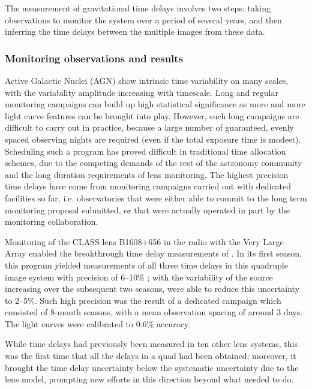 The measurement of gravitational time delays involves two steps:  taking
observations to monitor the system over a period of several years,
and then inferring the time delays between the multiple images from
these data.


\subsubsection{Monitoring observations and results}

Active Galactic Nuclei (AGN) show intrinsic time variability on many
scales, with the variability amplitude increasing with timescale. Long
and regular
monitoring campaigns can build up high statistical significance as
more and more light curve features can be brought into play.  However,
such long campaigns are difficult to carry out in practice, because a
large number of
guaranteed, evenly spaced
observing nights are required (even if the
total exposure time is modest). Scheduling such a program has proved
difficult in traditional time allocation schemes, due to the competing
demands of the rest of the astronomy community and the long duration
requirements of lens monitoring. The highest precision time delays
have come from monitoring campaigns carried out with dedicated
facilities so far, i.e. observatories that were either able to commit
to the long term monitoring proposal submitted, or that were actually
operated in part by the monitoring collaboration.


Monitoring of the CLASS lens B1608$+$656 in the radio with the Very
Large Array enabled the breakthrough  time delay measurements of
\citet{Fas++02}. In its first season, this program  yielded measurements
of all three time delays in this quadruple image system with precision
of 6--10\% \citep{Fas++99}; with the variability of the source
increasing over the subsequent two seasons, \citet{Fas++02} were able
to reduce this uncertainty to 2--5\%. Such high precision was the
result of a dedicated campaign which consisted of 8-month seasons,
with a mean observation spacing of around 3 days. The light curves
were calibrated to 0.6\% accuracy.

While time delays had previously been measured in ten other lens
systems, this was the first time that all the delays in a quad had
been obtained; moreover, it brought the time delay uncertainty below
the systematic uncertainty due to the lens model, prompting new
efforts in this direction beyond what \citet{K+F99} needed to do.

